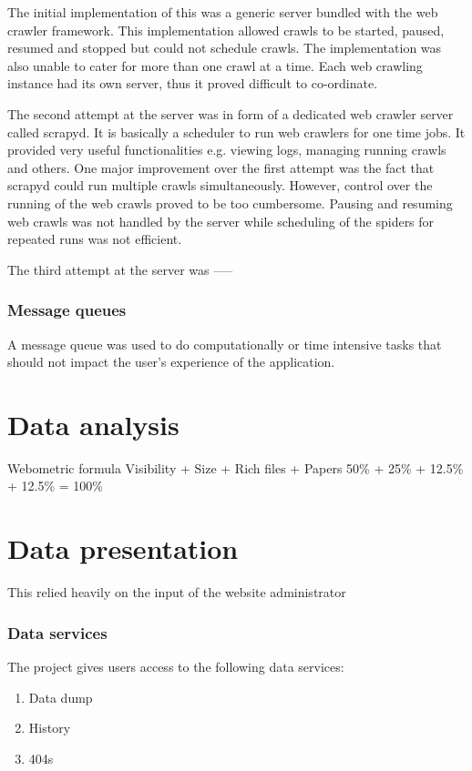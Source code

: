 \noindent
The initial implementation of this was a generic server bundled with the web crawler framework. This implementation allowed crawls to be started, paused, resumed and stopped but could not schedule crawls. The implementation was also unable to cater for more than one crawl at a time. Each web crawling instance had its own server, thus it proved difficult to co-ordinate.

\noindent
The second attempt at the server was in form of a dedicated web crawler server called scrapyd. It is basically a scheduler to run web crawlers for one time jobs. It provided very useful functionalities e.g. viewing logs, managing running crawls and others. One major improvement over the first attempt was the fact that scrapyd could run multiple crawls simultaneously. However, control over the running of the web crawls proved to be too cumbersome. Pausing and resuming web crawls was not handled by the server while scheduling of the spiders for repeated runs was not efficient.

\noindent
The third attempt at the server was -----
\subsubsection{Message queues}
\noindent
A message queue was used to do computationally or time intensive tasks that should not impact the user's experience of the application.

\section{Data analysis}
Webometric formula
Visibility + Size + Rich files + Papers
50\% + 25\% + 12.5\% + 12.5\% = 100\%


\section{Data presentation}
This relied heavily on the input of the website administrator
\subsubsection{Data services}
The project gives users access to the following data services:
\begin{enumerate}
\item Data dump
\item History
\item 404s
\end{enumerate}

